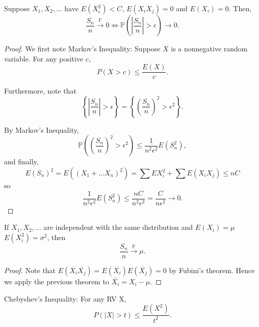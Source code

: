\documentclass[11pt]{scrartcl}
\renewcommand{\P}{\mathbb{P}}
\begin{document}
Suppose $X_1, X_2, \dots$ have $E(X_i^2) < C$, $E(X_iX_j) = 0$ and $E(X_i) = 0$.  Then, 
$$\frac{S_n}{n} \xrightarrow{\P} 0 \Leftrightarrow \P\left (|\frac{S_n}{n}| > \epsilon \right ) \rightarrow 0.$$ 
\begin{proof}
We first note Markov's Inequality: Suppose $X$ is a nonnegative random variable.  For any positive $c$, 
$$P(X > c) \le \frac{E(X)}{c}.$$

Furthermore, note that $$\left \{ \left| \frac{S_n}{n}\right| > \epsilon\right \} = \left \{\left (\frac{S_n}{n}\right )^2 > \epsilon^2\right \}.$$

By Markov's Inequality,
$$\P((\frac{S_n}{n})^2 > \epsilon^2) \le \frac{1}{n^2\epsilon^2} E(S_n^2),$$
and finally,
$$E(S_n)^2 = E((X_1 + \dots X_n)^2)=\sum EX_i^2 + \sum E(X_iX_j) \le nC$$
so 
$$\frac{1}{n^2\epsilon^2} E(S_n^2) \le \frac{nC}{n^2\epsilon^2} = \frac{C}{n\epsilon^2} \rightarrow 0.$$
\end{proof}
\begin{corollary}If $X_1, X_2, \dots$ are independent with the same distribution and $E(X_i) = \mu$ $E(X_i^2) = \sigma^2$, then 
$$\frac{S_n}{n} \xrightarrow{\P} \mu.$$
\end{corollary}
\begin{proof}
Note that $E(\overline{X_i}\overline{X_j}) = E(\overline{X_i})E(\overline{X_j}) = 0$ by Fubini's theorem.  Hence we apply the previous theorem to $\bar{X_i} = X_i - \mu$.
\end{proof}
\begin{fact} Chebyshev's Inequality: For any RV X, 
$$P(|X| > t) \le \frac{E(X^2)}{t^2}.$$
\end{fact}
\end{document}
